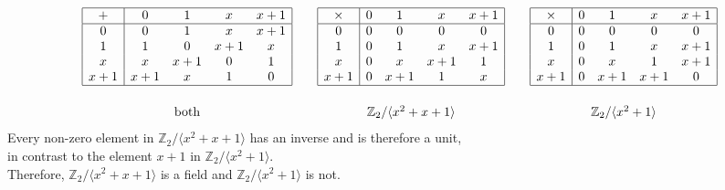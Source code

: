 \documentclass[11pt]{article}
\begin{document}
\[\begin{array}{c}\begin{array}{|c|cccc|}\hline
    +       &       0 &       1 &     x   &     x+1\\\hline
          0 &       0 &       1 &     x   &     x+1\\
          1 &       1 &       0 &     x+1 &     x  \\
        x   &     x   &     x+1 &       0 &       1\\
        x+1 &     x+1 &     x   &       1 &       0\\\hline
  \end{array}\\[14mm]\textrm{both}\end{array}\quad
  \begin{array}{c}\begin{array}{|c|cccc|}\hline
   \times   &       0 &       1 &     x   &     x+1\\\hline
          0 &       0 &       0 &       0 &       0\\
          1 &       0 &       1 &     x   &     x+1\\
        x   &       0 &     x   &     x+1 &       1\\
        x+1 &       0 &     x+1 &       1 &     x  \\\hline
  \end{array}\\[14mm]\mathbb{Z}_2/\langle x^2+x+1\rangle\end{array}\quad
  \begin{array}{c}\begin{array}{|c|cccc|}\hline
   \times   &       0 &       1 &     x   &     x+1\\\hline
          0 &       0 &       0 &       0 &       0\\
          1 &       0 &       1 &     x   &     x+1\\
        x   &       0 &     x   &       1 &     x+1\\
        x+1 &       0 &     x+1 &     x+1 &       0\\\hline
  \end{array}\\[14mm]\mathbb{Z}_2/\langle x^2 + 1\rangle\end{array}\]
Every non-zero element in $\mathbb{Z}_2/\langle x^2+x+1\rangle$ has an inverse and is therefore a unit,
\\in contrast to the element $x+1$ in $\mathbb{Z}_2/\langle x^2+1\rangle$.
\\Therefore,  $\mathbb{Z}_2/\langle x^2+x+1\rangle$ is a field and $\mathbb{Z}_2/\langle x^2+1\rangle$ is not.
\end{document}
